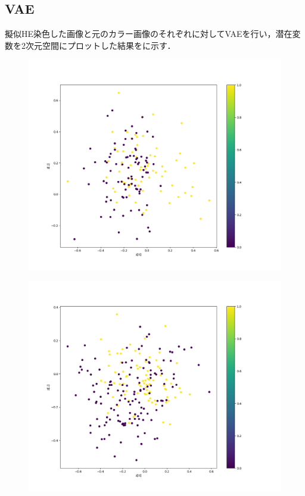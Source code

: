 \subsection{VAE}
擬似HE染色した画像と元のカラー画像のそれぞれに対してVAEを行い，潜在変数を2次元空間にプロットした結果をに示す．
\begin{figure}[H]
	\centering
	
	\begin{minipage}[b]{0.45\columnwidth}
		\centering
		\includegraphics[clip, width=\linewidth]{fig/variational_auto_encoder/vae_colon_epoch_100_c13_he}
		\label{fig:}
	\end{minipage}
	\begin{minipage}[b]{0.45\columnwidth}
		\centering
		\includegraphics[clip, width=\linewidth]{fig/variational_auto_encoder/vae_colon_epoch_299_c13_rgb}

\end{minipage}
\end{figure}
